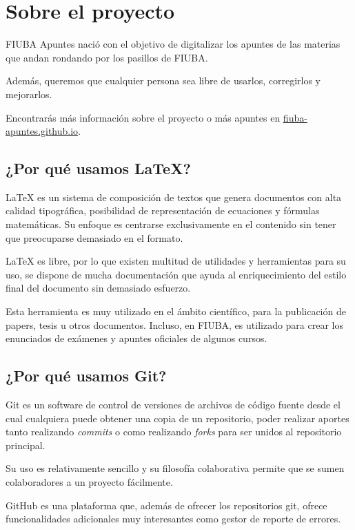 \documentclass[principal.tex]{subfiles}
\begin{document}
\newpage
\section{Sobre el proyecto}
FIUBA Apuntes nació con el objetivo de digitalizar los apuntes de las materias que andan rondando por los pasillos de FIUBA.

Además, queremos que cualquier persona sea libre de usarlos, corregirlos y mejorarlos.

Encontrarás más información sobre el proyecto o más apuntes en \href{http://fiuba-apuntes.github.io}{fiuba-apuntes.github.io}.

\subsection{¿Por qué usamos LaTeX?}

LaTeX es un sistema de composición de textos que genera documentos con alta calidad tipográfica, posibilidad de representación de ecuaciones y fórmulas matemáticas. Su enfoque es centrarse exclusivamente en el contenido sin tener que preocuparse demasiado en el formato.

LaTeX es libre, por lo que existen multitud de utilidades y herramientas para su uso, se dispone de mucha documentación que ayuda al enriquecimiento del estilo final del documento sin demasiado esfuerzo.

Esta herramienta es muy utilizado en el ámbito científico, para la publicación de papers, tesis u otros documentos. Incluso, en FIUBA, es utilizado para crear los enunciados de exámenes y apuntes oficiales de algunos cursos.

\subsection{¿Por qué usamos Git?}

Git es un software de control de versiones de archivos de código fuente desde el cual cualquiera puede obtener una copia de un repositorio, poder realizar aportes tanto realizando \textit{commits} o como realizando \textit{forks} para ser unidos al repositorio principal.

Su uso es relativamente sencillo y su filosofía colaborativa permite que se sumen colaboradores a un proyecto fácilmente.

GitHub es una plataforma que, además de ofrecer los repositorios git, ofrece funcionalidades adicionales muy interesantes como gestor de reporte de errores.
\end{document}
